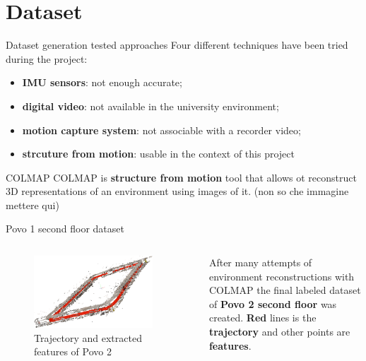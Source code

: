 \documentclass[
    center,
]{beamer}
\begin{document}
\section{Dataset}
\begin{frame}{Dataset generation tested approaches}
    Four different techniques have been tried during the project:
    \begin{itemize}
        \item \textbf{IMU sensors}: not enough accurate;
        \item \textbf{digital video}: not available in the university environment;
        \item \textbf{motion capture system}: not associable with a recorder video;
        \item \textbf{strcuture from motion}: usable in the context of this project
    \end{itemize}
\end{frame}
\begin{frame}{COLMAP}
    COLMAP is \textbf{structure from motion} tool that allows ot reconstruct 3D representations of an environment using images of it. (non so che immagine mettere qui)
\end{frame}
\begin{frame}{Povo 1 second floor dataset}
    \begin{columns}
        \begin{figure}
            \centering
            \includegraphics[width=0.9\textwidth]{../imgs/extracted_features_colmap.png}
            \caption{Trajectory and extracted features of Povo 2}
        \end{figure}

        After many attempts of environment reconstructions with COLMAP the final labeled dataset of \textbf{Povo 2 second floor} was created. \textbf{Red} lines is the \textbf{trajectory} and other points are \textbf{features}.
    \end{columns}
\end{frame}
\end{document}
